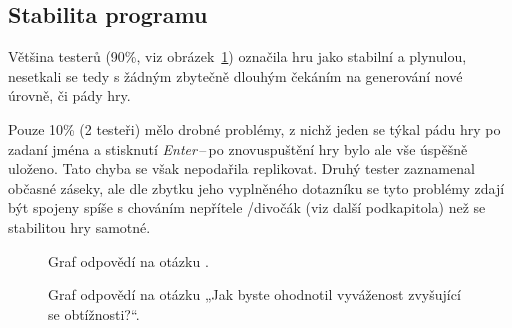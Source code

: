 \subsection*{Stabilita programu}
Většina testerů (90\%, viz obrázek~\ref{fig:hodnoceni_stabilita}) označila hru jako stabilní a plynulou, nesetkali se tedy s žádným zbytečně dlouhým čekáním na generování nové úrovně, či pády hry.

Pouze 10\% (2 testeři) mělo drobné problémy, z nichž jeden se týkal pádu hry po zadaní jména a stisknutí \textit{Enter}\,--\,po znovuspuštění hry bylo ale vše úspěšně uloženo. Tato chyba se však nepodařila replikovat. Druhý tester zaznamenal občasné záseky, ale dle zbytku jeho vyplněného dotazníku se tyto problémy zdají být spojeny spíše s chováním nepřítele /divočák (viz další podkapitola) než se stabilitou hry samotné.\\

\begin{figure}[hb]
    \centering
    \caption{Graf odpovědí na otázku .}
    \label{fig:hodnoceni_stabilita}
\end{figure}

\begin{figure}[ht]
    \centering
    \caption{Graf odpovědí na otázku „Jak byste ohodnotil vyváženost zvyšující se obtížnosti?“.}
    \label{fig:hodnoceni_vyvazenost}
\end{figure}

